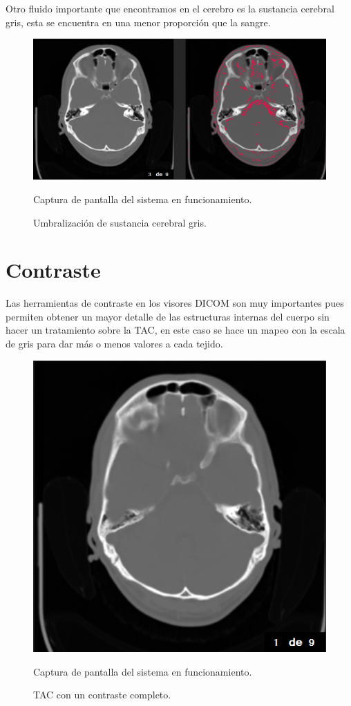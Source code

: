 \documentclass[12pt]{report}
\begin{document}
\newpage
\vspace*{3cm}
Otro fluido importante que encontramos en el cerebro es la sustancia cerebral gris, esta se encuentra en una menor proporción que la sangre.
\begin{figure}[H]
\centering
\includegraphics[width = 15 cm, height = 8 cm]{umbralSustaciaCerebralGris}
\caption{Umbralización de sustancia cerebral gris.}
Captura de pantalla del sistema en funcionamiento.
\end{figure}

\newpage
\section{Contraste}
Las herramientas de contraste en los visores DICOM son muy importantes pues permiten obtener un mayor detalle de las estructuras internas del cuerpo sin hacer un tratamiento sobre la TAC, en este caso se hace un mapeo con la escala de gris para dar más o menos valores a cada tejido.
\vspace{2cm}
\begin{figure}[H]
\centering
\includegraphics[width = 7 cm, height = 7 cm]{contrasteDefault}
\caption{TAC con un contraste completo.}
Captura de pantalla del sistema en funcionamiento.
\end{figure}
\end{document}
